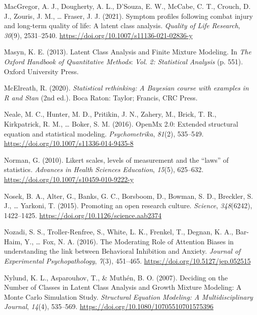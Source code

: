 \documentclass[
  ,man,floatsintext]{apa6}
\newlength{\cslhangindent}
\newlength{\cslentryspacingunit} %
\newenvironment{CSLReferences}[2] %
 {%
  \setlength{\parindent}{0pt}
  \ifodd #1
  \let\oldpar\par
  \def\par{\hangindent=\cslhangindent\oldpar}
  \fi
  \setlength{\parskip}{#2\cslentryspacingunit}
 }%
 {}
\begin{document}
\begin{CSLReferences}{1}{0}
\leavevmode{}%
MacGregor, A. J., Dougherty, A. L., D'Souza, E. W., McCabe, C. T., Crouch, D. J., Zouris, J. M., \ldots{} Fraser, J. J. (2021). Symptom profiles following combat injury and long-term quality of life: A latent class analysis. \emph{Quality of Life Research}, \emph{30}(9), 2531--2540. \url{https://doi.org/10.1007/s11136-021-02836-y}

\leavevmode{}%
Masyn, K. E. (2013). Latent {Class} {Analysis} and {Finite} {Mixture} {Modeling}. In \emph{The {Oxford} {Handbook} of {Quantitative} {Methods}}: \emph{Vol.} \emph{2: Statistical Analysis} (p. 551). Oxford University Press.

\leavevmode{}%
McElreath, R. (2020). \emph{Statistical rethinking: A {Bayesian} course with examples in {R} and {Stan}} (2nd ed.). Boca Raton: Taylor; Francis, CRC Press.

\leavevmode{}%
Neale, M. C., Hunter, M. D., Pritikin, J. N., Zahery, M., Brick, T. R., Kirkpatrick, R. M., \ldots{} Boker, S. M. (2016). Open{M}x 2.0: {E}xtended structural equation and statistical modeling. \emph{Psychometrika}, \emph{81}(2), 535--549. \url{https://doi.org/10.1007/s11336-014-9435-8}

\leavevmode{}%
Norman, G. (2010). Likert scales, levels of measurement and the {``laws''} of statistics. \emph{Advances in Health Sciences Education}, \emph{15}(5), 625--632. \url{https://doi.org/10.1007/s10459-010-9222-y}

\leavevmode{}%
Nosek, B. A., Alter, G., Banks, G. C., Borsboom, D., Bowman, S. D., Breckler, S. J., \ldots{} Yarkoni, T. (2015). Promoting an open research culture. \emph{Science}, \emph{348}(6242), 1422--1425. \url{https://doi.org/10.1126/science.aab2374}

\leavevmode{}%
Nozadi, S. S., Troller-Renfree, S., White, L. K., Frenkel, T., Degnan, K. A., Bar-Haim, Y., \ldots{} Fox, N. A. (2016). The {Moderating} {Role} of {Attention} {Biases} in understanding the link between {Behavioral} {Inhibition} and {Anxiety}. \emph{Journal of Experimental Psychopathology}, \emph{7}(3), 451--465. \url{https://doi.org/10.5127/jep.052515}

\leavevmode{}%
Nylund, K. L., Asparouhov, T., \& Muthén, B. O. (2007). Deciding on the {Number} of {Classes} in {Latent} {Class} {Analysis} and {Growth} {Mixture} {Modeling}: {A} {Monte} {Carlo} {Simulation} {Study}. \emph{Structural Equation Modeling: A Multidisciplinary Journal}, \emph{14}(4), 535--569. \url{https://doi.org/10.1080/10705510701575396}


\end{CSLReferences}
\end{document}
